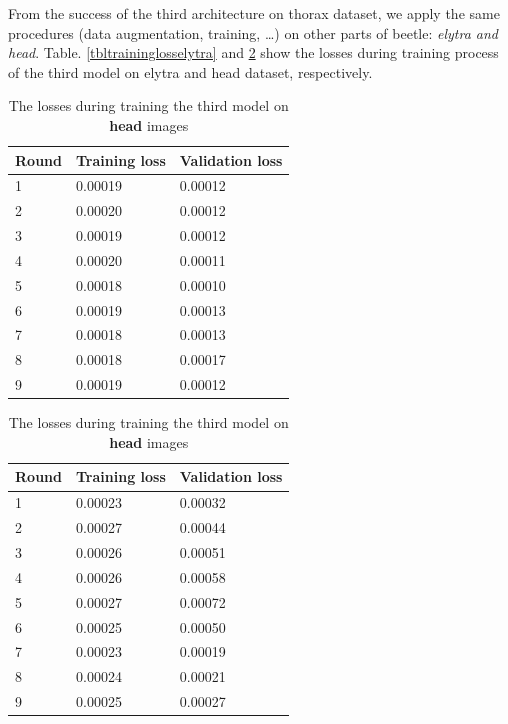 From the success of the third architecture on thorax dataset, we apply the same procedures (data augmentation, training, \ldots) on other parts of beetle: \textit{elytra and head}. Table. \ref{tbltraininglosselytra} and \ref{tbltraininglosshead} show the losses during training process  of the third model on elytra and head dataset, respectively.

\begin{table}[htbp]
\begin{minipage}{0.5\linewidth}
	\centering
	\begin{tabular}{l l l}
	Round & Training loss & Validation loss \\ \hline
	1 & 0.00019 & 0.00012  \\ \hline
	2 & 0.00020 & 0.00012 \\ \hline
	3 & 0.00019 & 0.00012 \\ \hline
	4 & 0.00020 & 0.00011 \\ \hline
	5 & 0.00018 & 0.00010 \\ \hline
	6 & 0.00019 & 0.00013 \\ \hline
	7 & 0.00018 & 0.00013 \\ \hline
	8 & 0.00018 & 0.00017 \\ \hline
	9 & 0.00019 & 0.00012 \\ \hline
	\end{tabular}
	\caption{\small{The losses during training the third model on \textbf{elytra} images}}
	\label{tbltraininglosselytra}
\end{minipage}
\hfill
\begin{minipage}{0.5\linewidth}
	\centering
	\begin{tabular}{l l l}
	Round & Training loss & Validation loss \\ \hline
	1 & 0.00023 & 0.00032  \\ \hline
	2 & 0.00027 & 0.00044 \\ \hline
	3 & 0.00026 & 0.00051 \\ \hline
	4 & 0.00026 & 0.00058 \\ \hline
	5 & 0.00027 & 0.00072 \\ \hline
	6 & 0.00025 & 0.00050 \\ \hline
	7 & 0.00023 & 0.00019 \\ \hline
	8 & 0.00024 & 0.00021 \\ \hline
	9 & 0.00025 & 0.00027 \\ \hline
	\end{tabular}
	\caption{\small{The losses during training the third model on \textbf{head} images}}
	\label{tbltraininglosshead}
\end{minipage}
\end{table}

